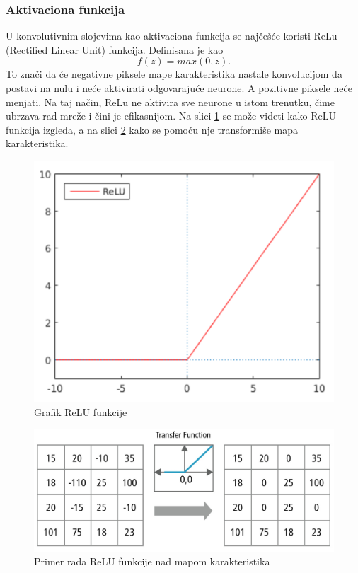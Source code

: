 \documentclass[a4paper]{article}
\begin{document}
\subsubsection{Aktivaciona funkcija}
\label{aktivaciona_funkcija}

U konvolutivnim slojevima kao aktivaciona funkcija se najčešće koristi ReLu (Rectified Linear Unit) funkcija. Definisana je kao $$ f(z) = max(0, z). $$ To znači da će negativne piksele mape karakteristika nastale konvolucijom da postavi na nulu i neće aktivirati odgovarajuće neurone. A pozitivne piksele neće menjati. Na taj način, ReLu ne aktivira sve neurone u istom trenutku, čime ubrzava rad mreže i čini je efikasnijom. Na slici \ref{fig:relu_fja} se može videti kako ReLU funkcija izgleda, a na slici \ref{fig:relu_transform} kako se pomoću nje transformiše mapa karakteristika.

\begin{figure}[h!]
\begin{center}
\includegraphics[scale=0.6]{relu_graph.png}
\end{center}
\caption{Grafik ReLU funkcije}
\label{fig:relu_fja}
\end{figure}


\begin{figure}[h!]
\begin{center}
\includegraphics[scale=0.20]{relu1.jpg}
\end{center}
\caption{Primer rada ReLU funkcije nad mapom karakteristika}
\label{fig:relu_transform}
\end{figure}
\end{document}
